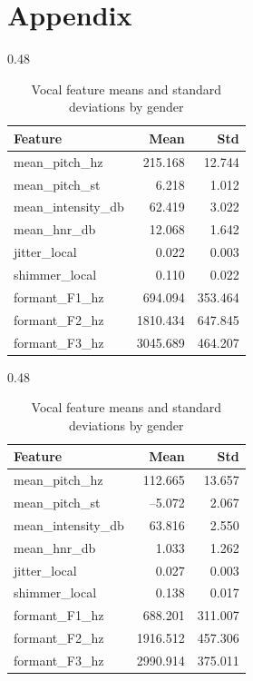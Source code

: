 \newpage
\chapter{Appendix}

\begin{table}[ht]
    \centering
    \begin{subtable}[t]{0.48\textwidth}
      \centering
      \caption{Summary statistics for female speakers}
      \label{tab:summary_female}
      \begin{tabular}{l r r}
        \toprule
        Feature               & Mean     & Std      \\
        \midrule
        mean\_pitch\_hz       & 215.168  & 12.744   \\
        mean\_pitch\_st       &   6.218  &  1.012   \\
        mean\_intensity\_db   &  62.419  &  3.022   \\
        mean\_hnr\_db         &  12.068  &  1.642   \\
        jitter\_local         &   0.022  &  0.003   \\
        shimmer\_local        &   0.110  &  0.022   \\
        formant\_F1\_hz       & 694.094  & 353.464  \\
        formant\_F2\_hz       & 1810.434 & 647.845  \\
        formant\_F3\_hz       & 3045.689 & 464.207  \\
        \bottomrule
      \end{tabular}
    \end{subtable}%
    \hfill
    \begin{subtable}[t]{0.48\textwidth}
      \centering
      \caption{Summary statistics for male speakers}
      \label{tab:summary_male}
      \begin{tabular}{l r r}
        \toprule
        Feature               & Mean     & Std      \\
        \midrule
        mean\_pitch\_hz       & 112.665  & 13.657   \\
        mean\_pitch\_st       &  –5.072  &  2.067   \\
        mean\_intensity\_db   &  63.816  &  2.550   \\
        mean\_hnr\_db         &   1.033  &  1.262   \\
        jitter\_local         &   0.027  &  0.003   \\
        shimmer\_local        &   0.138  &  0.017   \\
        formant\_F1\_hz       & 688.201  & 311.007  \\
        formant\_F2\_hz       & 1916.512 & 457.306  \\
        formant\_F3\_hz       & 2990.914 & 375.011  \\
        \bottomrule
      \end{tabular}
    \end{subtable}
    \caption{Vocal feature means and standard deviations by gender}
    \label{tab:summary_gender}
  \end{table}
  
